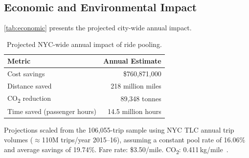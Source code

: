 \documentclass[a4paper,fleqn]{cas-dc}
\begin{document}
\subsection{Economic and Environmental Impact}

\autoref{tab:economic} presents the projected city-wide annual impact.

\begin{table}[t]
\centering
\caption{Projected NYC-wide annual impact of ride pooling.\label{tab:economic}}
\begin{threeparttable}
\begin{tabularx}{\columnwidth}{>{\raggedright\arraybackslash}X r}
\toprule
\textbf{Metric} & \textbf{Annual Estimate} \\
\midrule
Cost savings                  & \$760,871,000 \\
Distance saved                & 218 million miles \\
CO\textsubscript{2} reduction & 89,348 tonnes \\
Time saved (passenger hours)  & 14.5 million hours \\
\bottomrule
\end{tabularx}
\begin{tablenotes}
  \small
  \item Projections scaled from the 106,055-trip sample using NYC TLC annual trip volumes ($\approx$110M trips/year 2015--16), assuming a constant pool rate of 16.06\% and average savings of 19.74\%. Fare rate: \$3.50/mile. CO\textsubscript{2}: 0.411\,kg/mile~\cite{epa_emission_factors}.
\end{tablenotes}
\end{threeparttable}
\end{table}
\end{document}

